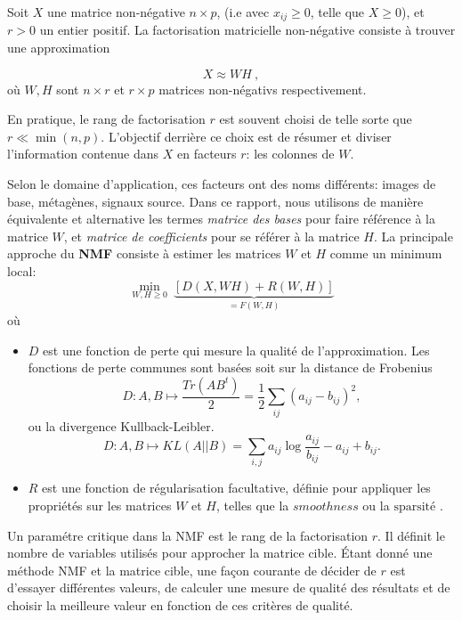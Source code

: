 \documentclass[runningheads]{llncs}
\begin{document}
Soit $X$ une matrice non-n\'egative $n \times p$, (i.e avec $x_{ij} \geq 0$,
telle que $X \geq 0$), et $r > 0$ un entier positif. 
La factorisation matricielle non-n\'egative consiste \`a trouver une approximation

\begin{equation}
X \approx W H\ , \label{NMFstd}
\end{equation} o\`u $W, H$ sont $n\times r$ et $r \times p$ matrices non-n\'egativs respectivement.

En pratique, le rang de factorisation $r$ est souvent choisi de telle sorte que $r \ll \min(n, p)$. 
L'objectif derrière ce choix est de r\'esumer et diviser l'information contenue dans $X$ en facteurs $r$: les colonnes de $W$.

Selon le domaine d'application, ces facteurs ont des noms diff\'erents: images de base, m\'etag\`enes, signaux source. Dans ce rapport, nous utilisons de mani\`ere \'equivalente et alternative les termes \emph{matrice des bases} pour faire r\'ef\'erence à la matrice $W$, et \emph{matrice de coefficients} pour se r\'ef\'erer à la matrice $H$.
La principale approche du \textbf{NMF} \cite{Gillis2014} consiste \`a estimer les matrices $W$ et $H$ comme un minimum local:
\begin{equation}
\min_{W, H \geq 0}\ \underbrace{[D(X, WH) + R(W, H)]}_{=F(W,H)} \label{nmf_min}
\end{equation}
o\`u

\begin{itemize}
\item $D$ est une fonction de perte qui mesure la qualit\'e de l'approximation.
Les fonctions de perte communes sont bas\'ees soit sur la distance de Frobenius
$$D: A,B\mapsto \frac{Tr(AB^t)}{2} = \frac{1}{2} \sum_{ij} (a_{ij} - b_{ij})^2,$$
ou la divergence Kullback-Leibler.
$$D: A,B\mapsto KL(A||B) = \sum_{i,j} a_{ij} \log \frac{a_{ij}}{b_{ij}} - a_{ij} + b_{ij}.$$
\item $ R $ est une fonction de r\'egularisation facultative, d\'efinie pour appliquer
les propri\'et\'es sur les matrices $W$ et $H$, telles que la \textit{$smoothness$} ou la \textit{$\text{sparsit\'e}$} \cite{Boutsidis2007}.
\end{itemize}

Un param\'etre critique dans la NMF est le rang de la factorisation $r$.
Il d\'efinit le nombre de variables utilis\'es pour approcher la matrice cible.
\'Etant donn\'e une m\'ethode NMF et la matrice cible, une façon courante de d\'ecider de $r $ est d'essayer diff\'erentes valeurs, de calculer une mesure de qualit\'e des r\'esultats et de choisir la meilleure valeur en fonction de ces critères de qualit\'e.
\end{document}

